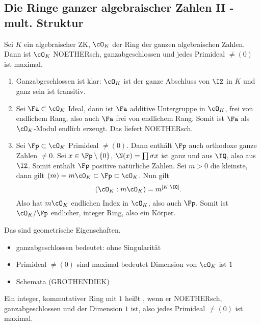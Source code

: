 
\renewcommand{\lecdate}{11.11.14}

\subsection{Die Ringe ganzer algebraischer Zahlen II - mult. Struktur}%

\begin{Satz}
 Sei $K$ ein algebraischer ZK, $\cO_K$ der Ring der ganzen algebraischen Zahlen. Dann ist $\cO_K$ NOETHERsch, ganzabgeschlossen und jedes Primideal $\neq (0)$ ist maximal.
\end{Satz}

\begin{Beweis}
 \begin{enumerate}
  \item Ganzabgeschlossen ist klar: $\cO_K$ ist der ganze Abschluss von $\IZ$ in $K$ und ganz sein ist transitiv.
  \item Sei $\Fa\subset \cO_K$ Ideal, dann ist $\Fa$ additive Untergruppe in $\cO_K$, frei von endlichem Rang, also auch $\Fa$ frei von endlichem Rang. Somit ist $\Fa$ als $\cO_K$-Modul endlich erzeugt. Das liefert NOETHERsch.
  \item Sei $\Fp\subset \cO_K$ Primideal $\neq(0)$. Dann enthält $\Fp$ auch orthodoxe ganze Zahlen $\neq 0$. Sei $x\in\Fp\setminus\{0\}$, $\N(x)=\prod\sigma x$ ist ganz und aus $\IQ$, also aus $\IZ$. Somit enthält $\Fp$ positive natürliche Zahlen. Sei $m>0$ die kleinste, dann gilt $(m)=m\cO_K \subset \Fp \subset \cO_K$. Nun gilt \[ (\cO_K:m\cO_K)=m^{[K:\IQ]}.\]
  Also hat $m\cO_K$ endlichen Index in $\cO_K$, also auch $\Fp$. Somit ist $\cO_K/\Fp$ endlicher, integer Ring, also ein Körper.
 \end{enumerate}
\end{Beweis}

\begin{Bemerkung}
 Das sind geometrische Eigenschaften.
 \begin{itemize}
  \item ganzabgeschlossen bedeutet: ohne Singularität
  \item Primideal $\neq (0)$ sind maximal bedeutet Dimension von $\cO_K$ ist $1$
  \item \glqq Schemata\grqq{} (GROTHENDIEK)
 \end{itemize}
\end{Bemerkung}

\begin{Definition}
 Ein integer, kommutativer Ring mit $1$ heißt , wenn er NOETHERsch, ganzabgeschlossen und der Dimension $1$ ist, also jedes Primideal $\neq (0)$ ist maximal.
\end{Definition}

